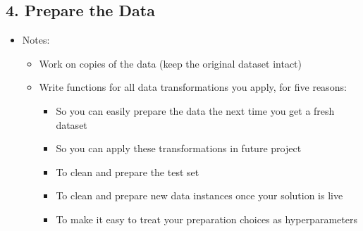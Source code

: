 
\begin{slide}
  \section[-2]{4. Prepare the Data}

\begin{PauseHighLight}\squeeze
  \begin{itemize}
  \item Notes:
    \begin{itemize}
    \item Work on copies of the data (keep the original dataset
      intact)\pause
    \item Write functions for all data transformations you apply, for
      five reasons:
      \begin{itemize}
      \item So you can easily prepare the data the next time you get a
        fresh dataset
      \item So you can apply these transformations in future project
      \item To clean and prepare the test set
      \item To clean and prepare new data instances once your solution
        is live
      \item To make it easy to treat your preparation choices as
        hyperparameters\pause
      \end{itemize}
    \end{itemize}
  \end{itemize}
\end{PauseHighLight}


\end{slide}


